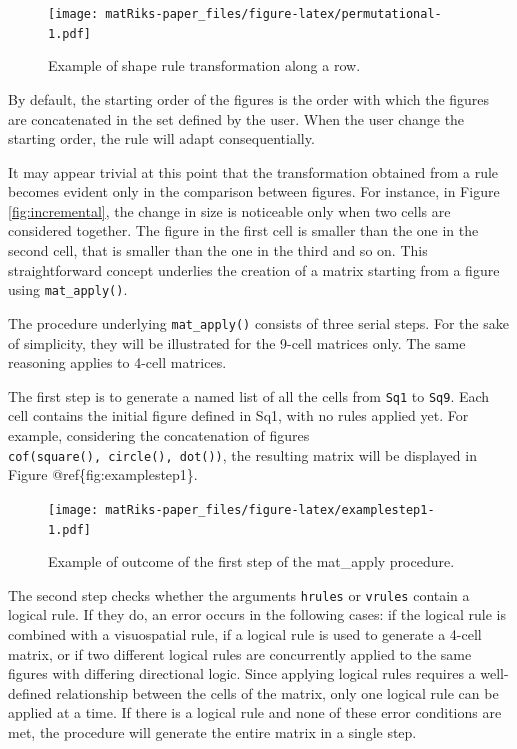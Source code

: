 \begin{figure}
\centering
\texttt{[image: matRiks-paper\_files/figure-latex/permutational-1.pdf]}
\caption{\label{fig:permutational}Example of shape rule transformation along a row.}
\end{figure}

By default, the starting order of the figures is the order with which the figures are concatenated in the set defined by the user.
When the user change the starting order, the rule will adapt consequentially.

It may appear trivial at this point that the transformation obtained from a rule becomes evident only in the comparison between figures.
For instance, in Figure \ref{fig:incremental}, the change in size is noticeable only when two cells are considered together.
The figure in the first cell is smaller than the one in the second cell, that is smaller than the one in the third and so on.
This straightforward concept underlies the creation of a matrix starting from a figure using \texttt{mat\_apply()}.

The procedure underlying \texttt{mat\_apply()} consists of three serial steps.
For the sake of simplicity, they will be illustrated for the 9-cell matrices only.
The same reasoning applies to 4-cell matrices.

The first step is to generate a named list of all the cells from \texttt{Sq1} to \texttt{Sq9}.
Each cell contains the initial figure defined in Sq1, with no rules applied yet.
For example, considering the concatenation of figures \texttt{cof(square(),\ circle(),\ dot())}, the resulting matrix will be displayed in Figure @ref\{fig:examplestep1\}.

\begin{figure}
\centering
\texttt{[image: matRiks-paper\_files/figure-latex/examplestep1-1.pdf]}
\caption{\label{fig:examplestep1}Example of outcome of the first step of the mat\_apply procedure.}
\end{figure}

The second step checks whether the arguments \texttt{hrules} or \texttt{vrules} contain a logical rule.
If they do, an error occurs in the following cases: if the logical rule is combined with a visuospatial rule, if a logical rule is used to generate a 4-cell matrix, or if two different logical rules are concurrently applied to the same figures with differing directional logic.
Since applying logical rules requires a well-defined relationship between the cells of the matrix, only one logical rule can be applied at a time.
If there is a logical rule and none of these error conditions are met, the procedure will generate the entire matrix in a single step.

